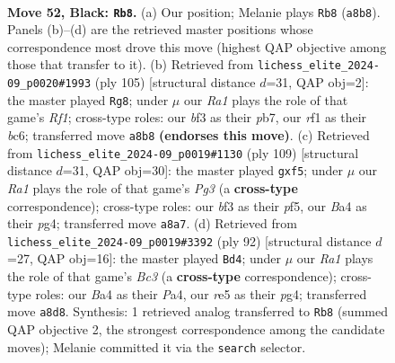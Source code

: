 \documentclass[11pt]{article}
\begin{document}
\clearpage

\begin{figure}[p]\centering
\begin{subfigure}{0.46\textwidth}\centering
\resizebox{\linewidth}{!}{%
\newchessgame
\chessboard[
  setfen={r7/8/pp5k/4R3/bP1r4/P4B1K/8/5R2 b - - 7 52},
  showmover=false,
  pgfstyle=straightmove, color=movearrow, markmove={a8-b8}
]}
\caption{}
\end{subfigure}\hfill
\begin{subfigure}{0.46\textwidth}\centering
\resizebox{\linewidth}{!}{%
\newchessgame
\chessboard[
  setfen={5r2/1Pk5/2B2p2/2K5/5Pbp/R7/8/8 b - - 1 53},
  showmover=false,
  pgfstyle=straightmove, color=movearrow, markmove={f8-g8}
]}
\caption{}
\end{subfigure}
\\[4pt]
\begin{subfigure}{0.46\textwidth}\centering
\resizebox{\linewidth}{!}{%
\newchessgame
\chessboard[
  setfen={5k2/7R/r1p3p1/P3RP2/6P1/2pr4/5K2/8 b - - 0 55},
  showmover=false,
  pgfstyle=straightmove, color=movearrow, markmove={g6-f5}
]}
\caption{}
\end{subfigure}\hfill
\begin{subfigure}{0.46\textwidth}\centering
\resizebox{\linewidth}{!}{%
\newchessgame
\chessboard[
  setfen={r7/5k2/8/b4p1p/P1R3p1/2B3P1/7P/5K2 w - - 14 47},
  showmover=false,
  pgfstyle=straightmove, color=movearrow, markmove={c3-d4}
]}
\caption{}
\end{subfigure}
\caption{\textbf{Move 52, Black: \texttt{Rb8}.} (a) Our position; Melanie plays \texttt{Rb8} (\texttt{a8b8}). Panels (b)--(d) are the retrieved master positions whose correspondence most drove this move (highest QAP objective among those that transfer to it). (b) Retrieved from \texttt{lichess\_elite\_2024-09\_p0020\#1993} (ply 105) [structural distance $d$=31, QAP obj=2]: the master played \texttt{Rg8}; under $\mu$ our \emph{Ra1} plays the role of that game's \emph{Rf1}; cross-type roles: our \emph{b}f3 as their \emph{p}b7, our \emph{r}f1 as their \emph{b}c6; transferred move \texttt{a8b8} \textbf{(endorses this move)}. (c) Retrieved from \texttt{lichess\_elite\_2024-09\_p0019\#1130} (ply 109) [structural distance $d$=31, QAP obj=30]: the master played \texttt{gxf5}; under $\mu$ our \emph{Ra1} plays the role of that game's \emph{Pg3} (a \textbf{cross-type} correspondence); cross-type roles: our \emph{b}f3 as their \emph{p}f5, our \emph{B}a4 as their \emph{p}g4; transferred move \texttt{a8a7}. (d) Retrieved from \texttt{lichess\_elite\_2024-09\_p0019\#3392} (ply 92) [structural distance $d$=27, QAP obj=16]: the master played \texttt{Bd4}; under $\mu$ our \emph{Ra1} plays the role of that game's \emph{Bc3} (a \textbf{cross-type} correspondence); cross-type roles: our \emph{B}a4 as their \emph{P}a4, our \emph{r}e5 as their \emph{p}g4; transferred move \texttt{a8d8}. Synthesis: 1 retrieved analog transferred to \texttt{Rb8} (summed QAP objective 2, the strongest correspondence among the candidate moves); Melanie committed it via the \texttt{search} selector.}
\label{fig:thought-m103}
\end{figure}
\end{document}
